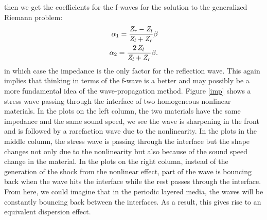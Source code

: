 \documentclass{article}
\begin{document}
then we get the coefficients for the f-waves for the solution to the generalized Riemann problem:
\begin{align}
\alpha_1= {\frac { {\it Z_r}-{\it Z_l}
  }{{\it Z_l}+{\it Z_r}}}\beta\\
\alpha_2=  \frac {{2}\,{\it Z_l}\,}{ {\it Z_l}+{\it Z_r}  }\beta.
\end{align}
in which case the impedance is the only factor for the reflection wave. This again implies that thinking in terms of the f-wave is a better and may possibly be a more fundamental idea of the wave-propagation method.
Figure \ref{imp} shows a stress wave passing through the interface of two homogeneous nonlinear materials. In the plots on the left column, the two materials have the same impedance and the same sound speed, we see the wave is sharpening in the front and is followed by a rarefaction wave due to the nonlinearity. In the plots in the middle column, the stress wave is passing through the interface but the shape changes not only due to the nonlinearity but also because of the sound speed change in the material. In the plots on the right column, instead of the generation of the shock from the nonlinear effect, part of the wave is bouncing back when the wave hits the interface while the rest passes through the interface. From here, we could imagine that in the periodic layered media, the waves will be constantly bouncing back between the interfaces. As a result, this gives rise to an equivalent dispersion effect.
\end{document}
